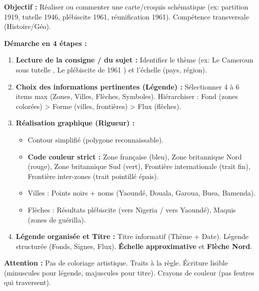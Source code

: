 \documentclass[11pt]{article}
\begin{document}
\begin{methode}
\textbf{Objectif :} Réaliser ou commenter une carte/croquis schématique (ex: partition 1919, tutelle 1946, plébiscite 1961, réunification 1961). Compétence transversale (Histoire/Géo).\par
\textbf{Démarche en 4 étapes :}
\begin{enumerate}
    \item \textbf{Lecture de la consigne / du sujet :} Identifier le thème (ex: \guillemotleft Le Cameroun sous tutelle \guillemotright, \guillemotleft Le plébiscite de 1961 \guillemotright) et l'échelle (pays, région).
    \item \textbf{Choix des informations pertinentes (Légende) :} Sélectionner 4 à 6 items max (Zones, Villes, Flèches, Symboles). Hiérarchiser : Fond (zones colorées) > Forme (villes, frontières) > Flux (flèches).
    \item \textbf{Réalisation graphique (Rigueur) :}
        \begin{itemize}
            \item Contour simplifié (polygone reconnaissable).
            \item \textbf{Code couleur strict :} Zone française (bleu), Zone britannique Nord (rouge), Zone britannique Sud (vert), Frontière internationale (trait fin), Frontière inter-zones (trait pointillé épais).
            \item Villes : Points noirs + noms (Yaoundé, Douala, Garoua, Buea, Bamenda).
            \item Flèches : Résultats plébiscite (vers Nigeria / vers Yaoundé), Maquis (zones de guérilla).
        \end{itemize}
    \item \textbf{Légende organisée et Titre :} Titre informatif (Thème + Date). Légende structurée (Fonds, Signes, Flux). \textbf{Échelle approximative} et \textbf{Flèche Nord}.
\end{enumerate}
\textbf{Attention :} Pas de coloriage artistique. Traits à la règle. Écriture lisible (minuscules pour légende, majuscules pour titre). Crayons de couleur (pas feutres qui traversent).
\end{methode}
\end{document}
